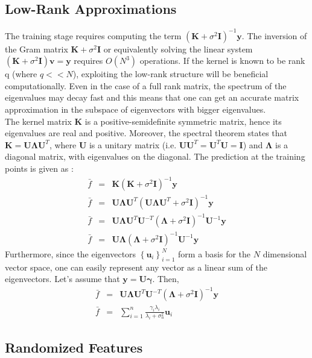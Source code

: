 \documentclass{article}
\begin{document}
\subsection{Low-Rank Approximations}
The training stage requires computing the term $(\mathbf{K}+\sigma^2\mathbf{I})^{-1}\mathbf{y}$. The inversion of the Gram matrix $\mathbf{K}+\sigma^2\mathbf{I}$ or equivalently solving the linear system $(\mathbf{K}+\sigma^2\mathbf{I})\mathbf{v}=\mathbf{y}$ requires $O(N^3)$ operations. If the kernel is known to be rank q (where $q<<N$), exploiting the low-rank structure will be beneficial computationally. Even in the case of a full rank matrix, the spectrum of the eigenvalues may decay fast and this means that one can get an accurate matrix approximation in the subspace of eigenvectors with bigger eigenvalues. 
\\ The kernel matrix $\mathbf{K}$ is a positive-semidefinite symmetric matrix, hence its eigenvalues are real and positive. Moreover, the spectral theorem states that $\mathbf{K}=\mathbf{U\Lambda U}^T$, where $\mathbf{U}$ is a unitary matrix (i.e. $\mathbf{U}\mathbf{U}^T=\mathbf{U}^T\mathbf{U}=\mathbf{I}$) and $\mathbf{\Lambda}$ is a diagonal matrix, with eigenvalues on the diagonal. The prediction at the training points is given as :
\begin{eqnarray}
\bar{f}&=&\mathbf{K}(\mathbf{K}+\sigma^2\mathbf{I})^{-1}\mathbf{y} \nonumber \\
\bar{f}&=&\mathbf{U\Lambda U}^T(\mathbf{U\Lambda U}^T+\sigma^2\mathbf{I})^{-1}\mathbf{y} \nonumber \\
\bar{f}&=& \mathbf{U\Lambda U}^T\mathbf{U}^{-T}(\mathbf{\Lambda}+\sigma^2\mathbf{I})^{-1}\mathbf{U}^{-1}\mathbf{y} \nonumber \\
\bar{f}&=& \mathbf{U\Lambda}(\mathbf{\Lambda}+\sigma^2\mathbf{I})^{-1}\mathbf{U}^{-1}\mathbf{y} 
\end{eqnarray}
Furthermore, since the eigenvectors $\left\{\mathbf{u}_i\right\}_{i=1}^N$ form a basis for the $N$ dimensional vector space, one can easily represent any vector as a linear sum of the eigenvectors. Let's assume that $\mathbf{y}=\mathbf{U}\mathbf{\gamma}$. Then,
\begin{eqnarray}
\bar{f}&=& \mathbf{U\Lambda U}^T\mathbf{U}^{-T}(\mathbf{\Lambda}+\sigma^2\mathbf{I})^{-1}\mathbf{y}  \nonumber \\
\bar{f}&=&\sum_{i=1}^n\frac{\gamma_i\lambda_i}{\lambda_i+\sigma_n^2}\mathbf{u}_i
\end{eqnarray}

\subsection{Randomized Features}
\end{document}
